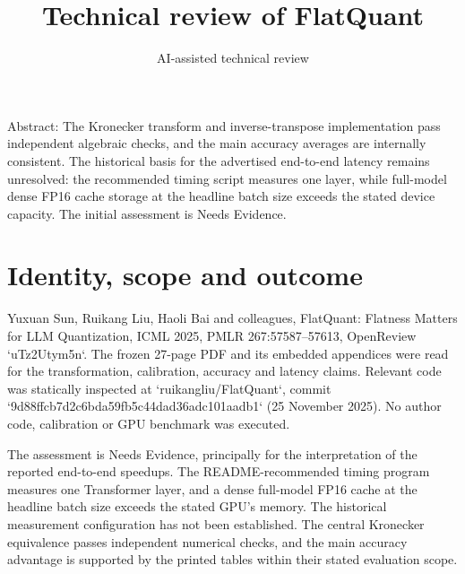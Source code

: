 \documentclass[10pt]{article}
\title{Technical review of FlatQuant}
\author{AI-assisted technical review}
\date{}
\begin{document}
\maketitle
Abstract: The Kronecker transform and inverse-transpose implementation pass independent algebraic checks, and the main accuracy averages are internally consistent. The historical basis for the advertised end-to-end latency remains unresolved: the recommended timing script measures one layer, while full-model dense FP16 cache storage at the headline batch size exceeds the stated device capacity. The initial assessment is Needs Evidence.\par
\section*{Identity, scope and outcome}
Yuxuan Sun, Ruikang Liu, Haoli Bai and colleagues, FlatQuant: Flatness Matters for LLM Quantization, ICML 2025, PMLR 267:57587–57613, OpenReview `uTz2Utym5n`. The frozen 27-page PDF and its embedded appendices were read for the transformation, calibration, accuracy and latency claims. Relevant code was statically inspected at `ruikangliu/FlatQuant`, commit `9d88ffcb7d2c6bda59fb5c44dad36adc101aadb1` (25 November 2025). No author code, calibration or GPU benchmark was executed.\par
The assessment is Needs Evidence, principally for the interpretation of the reported end-to-end speedups. The README-recommended timing program measures one Transformer layer, and a dense full-model FP16 cache at the headline batch size exceeds the stated GPU’s memory. The historical measurement configuration has not been established. The central Kronecker equivalence passes independent numerical checks, and the main accuracy advantage is supported by the printed tables within their stated evaluation scope.\par
\end{document}
